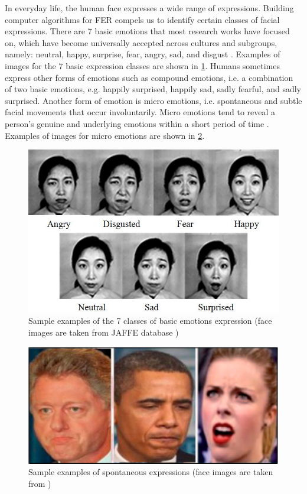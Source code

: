 \documentclass[master]{thesis-uestc}
\begin{document}
In everyday life, the human face expresses a wide range of expressions. Building computer algorithms for FER compels us to identify certain classes of facial expressions. There are 7 basic emotions that most research works have focused on, which have become universally accepted across cultures and subgroups, namely: neutral, happy, surprise, fear, angry, sad, and disgust \cite{Yu:2013:LRF:2459511.2459661}. Examples of images for the 7 basic expression classes are shown in \ref{7_basic_emotions}. Humans sometimes express other forms of emotions such as compound emotions, i.e. a combination of two basic emotions, e.g. happily surprised, happily sad, sadly fearful, and sadly surprised. Another form of emotion is micro emotions, i.e. spontaneous and subtle facial movements that occur involuntarily. Micro emotions tend to reveal a person’s genuine and underlying emotions within a short period of time \cite{josh2018}. Examples of images for micro emotions are shown in \ref{micro_emotions}.

\begin{figure}[ht]
\includegraphics[width=5in]{pic/7_basic_emotions.png}
\caption{Sample examples of the 7 classes of basic emotions expression (face images are taken from JAFFE database \cite{Michael-2017})}
\label{7_basic_emotions}
\end{figure}

\begin{figure}[ht]
\includegraphics[width=5in]{pic/micro_expressions.png}
\caption{Sample examples of spontaneous expressions (face images are taken from \cite{josh2018})}
\label{micro_emotions}
\end{figure}
\end{document}
